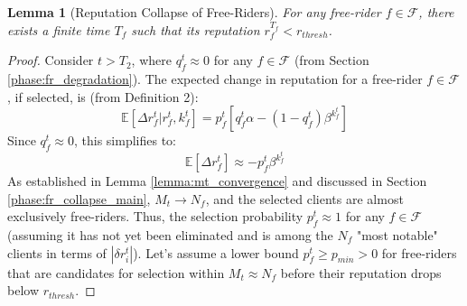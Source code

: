 \documentclass[conference]{IEEEtran}
\newtheorem{lemma}{Lemma}
\newcommand{\FC}{\mathcal{F}}
\newcommand{\E}{\mathbb{E}}
\begin{document}
\begin{lemma}[Reputation Collapse of Free-Riders]
\label{lemma:reputation_collapse}
For any free-rider $f \in \mathcal{F}$, there exists a finite time $T_f$ such that its reputation $r_f^{T_f} < r_{thresh}$.
\end{lemma}
\begin{proof}
Consider $t > T_2$, where $q_f^t \approx 0$ for any $f \in \mathcal{F}$ (from Section \ref{phase:fr_degradation}).
The expected change in reputation for a free-rider $f \in \FC$, if selected, is (from Definition 2):
\begin{equation}
    \E[\Delta r_f^t | r_f^t, k_f^t] = p_f^t [q_f^t \alpha - (1-q_f^t)\beta^{k_f^t}]
\end{equation}
Since $q_f^t \approx 0$, this simplifies to:
\begin{equation}
    \E[\Delta r_f^t] \approx - p_f^t \beta^{k_f^t}
\end{equation}
As established in Lemma \ref{lemma:mt_convergence} and discussed in Section \ref{phase:fr_collapse_main}, $M_t \to N_f$, and the selected clients are almost exclusively free-riders. Thus, the selection probability $p_f^t \approx 1$ for any $f \in \mathcal{F}$ (assuming it has not yet been eliminated and is among the $N_f$ "most notable" clients in terms of $|\delta r_i^t|$). Let's assume a lower bound $p_f^t \ge p_{min} > 0$ for free-riders that are candidates for selection within $M_t \approx N_f$ before their reputation drops below $r_{thresh}$.


\end{proof}
\end{document}
